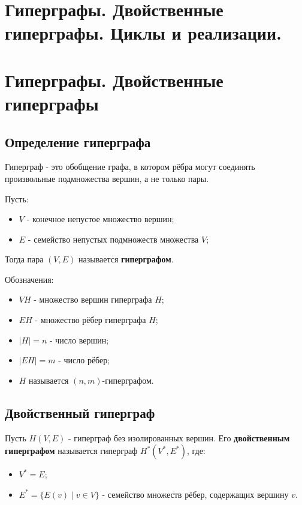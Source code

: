 {
	\section{Гиперграфы. Двойственные гиперграфы. Циклы и реализации.}

	\section*{Гиперграфы. Двойственные гиперграфы}

\subsection*{Определение гиперграфа}

Гиперграф - это обобщение графа, в котором рёбра могут соединять произвольные подмножества вершин, а не только пары.

Пусть:
\begin{itemize}
  \item $V$ - конечное непустое множество вершин;
  \item $E$ - семейство непустых подмножеств множества $V$;
\end{itemize}

Тогда пара $(V, E)$ называется \textbf{гиперграфом}.

Обозначения:
\begin{itemize}
  \item $VH$ - множество вершин гиперграфа $H$;
  \item $EH$ - множество рёбер гиперграфа $H$;
  \item $|H| = n$ - число вершин;
  \item $|EH| = m$ - число рёбер;
  \item $H$ называется $(n, m)$-гиперграфом.
\end{itemize}

\subsection*{Двойственный гиперграф}

Пусть $H(V, E)$ - гиперграф без изолированных вершин.  
Его \textbf{двойственным гиперграфом} называется гиперграф $H^*(V^*, E^*)$, где:
\begin{itemize}
  \item $V^* = E$;
  \item $E^* = \{E(v) \mid v \in V\}$ - семейство множеств рёбер, содержащих вершину $v$.
\end{itemize}

}
